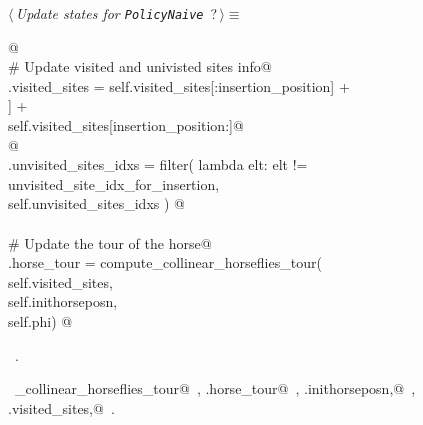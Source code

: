 \documentclass[11.5pt]{report}
\begin{document}
\newchunk 
\begin{flushleft} \small\label{scrap40}\raggedright\small
{} $\langle\,${\itshape Update states for \texttt{PolicyNaive}}\nobreak\ {\footnotesize {?}}$\,\rangle\equiv$
\vspace{-1ex}
\begin{list}{}{} \item
\mbox{}\verb@   @\\
\mbox{}\verb@# Update visited and univisted sites info@\\
\mbox{}\verb@self.visited_sites = self.visited_sites[:insertion_position]      +\@\\
\mbox{}\verb@                     [self.sites[unvisited_site_idx_for_insertion]] +\@\\
\mbox{}\verb@                     self.visited_sites[insertion_position:]@\\
\mbox{}\verb@  @\\
\mbox{}\verb@self.unvisited_sites_idxs = filter( lambda elt: elt != unvisited_site_idx_for_insertion, \@\\
\mbox{}\verb@                                    self.unvisited_sites_idxs ) @\\
\mbox{}\verb@@\\
\mbox{}\verb@# Update the tour of the horse@\\
\mbox{}\verb@self.horse_tour = compute_collinear_horseflies_tour(\@\\
\mbox{}\verb@                           self.visited_sites,         \@\\
\mbox{}\verb@                           self.inithorseposn, \@\\
\mbox{}\verb@                           self.phi) @\\
\mbox{}\verb@@{\NWsep}
\end{list}
\vspace{-1.5ex}
\footnotesize
\begin{list}{}{\setlength{\itemsep}{-\parsep}\setlength{\itemindent}{-\leftmargin}}
\item \NWtxtMacroRefIn\ .
\item \NWtxtIdentsUsed\nobreak\  \verb@compute_collinear_horseflies_tour@\nobreak\ , \verb@self.horse_tour@\nobreak\ , \verb@self.inithorseposn,@\nobreak\ , \verb@self.visited_sites,@\nobreak\ .
\item{}
\end{list}
\vspace{4ex}
\end{flushleft}
\end{document}
